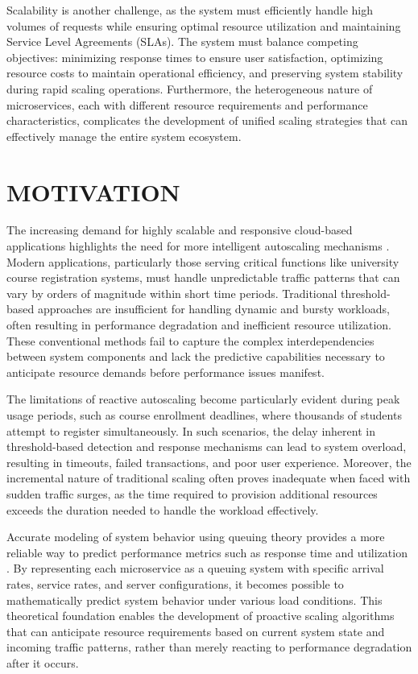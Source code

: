 Scalability is another challenge, as the system must efficiently handle high volumes of requests while ensuring optimal resource utilization and maintaining Service Level Agreements (SLAs). The system must balance competing objectives: minimizing response times to ensure user satisfaction, optimizing resource costs to maintain operational efficiency, and preserving system stability during rapid scaling operations. Furthermore, the heterogeneous nature of microservices, each with different resource requirements and performance characteristics, complicates the development of unified scaling strategies that can effectively manage the entire system ecosystem.

\section{MOTIVATION}

The increasing demand for highly scalable and responsive cloud-based applications highlights the need for more intelligent autoscaling mechanisms \cite{wang2024}. Modern applications, particularly those serving critical functions like university course registration systems, must handle unpredictable traffic patterns that can vary by orders of magnitude within short time periods. Traditional threshold-based approaches are insufficient for handling dynamic and bursty workloads, often resulting in performance degradation and inefficient resource utilization. These conventional methods fail to capture the complex interdependencies between system components and lack the predictive capabilities necessary to anticipate resource demands before performance issues manifest.

The limitations of reactive autoscaling become particularly evident during peak usage periods, such as course enrollment deadlines, where thousands of students attempt to register simultaneously. In such scenarios, the delay inherent in threshold-based detection and response mechanisms can lead to system overload, resulting in timeouts, failed transactions, and poor user experience. Moreover, the incremental nature of traditional scaling often proves inadequate when faced with sudden traffic surges, as the time required to provision additional resources exceeds the duration needed to handle the workload effectively.

Accurate modeling of system behavior using queuing theory provides a more reliable way to predict performance metrics such as response time and utilization \cite{lai2025}. By representing each microservice as a queuing system with specific arrival rates, service rates, and server configurations, it becomes possible to mathematically predict system behavior under various load conditions. This theoretical foundation enables the development of proactive scaling algorithms that can anticipate resource requirements based on current system state and incoming traffic patterns, rather than merely reacting to performance degradation after it occurs.

